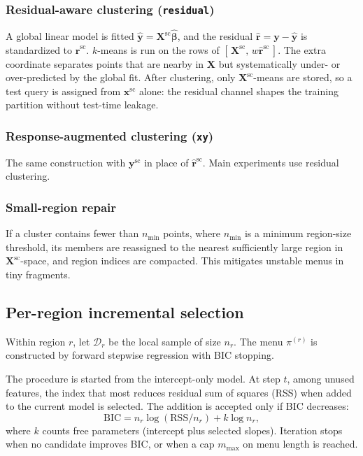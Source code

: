 \documentclass[pdflatex,sn-basic,Numbered]{sn-jnl}
\begin{document}
\subsubsection{Residual-aware clustering (\texttt{residual})}
A global linear model is fitted \(\hat{\mathbf{y}} = \mathbf{X}^{\mathrm{sc}}\hat{\boldsymbol{\beta}}\), and the residual \(\hat{\mathbf{r}} = \mathbf{y}-\hat{\mathbf{y}}\) is standardized to \(\hat{\mathbf{r}}^{\mathrm{sc}}\). \(k\)-means is run on the rows of \([\,\mathbf{X}^{\mathrm{sc}},\, w\hat{\mathbf{r}}^{\mathrm{sc}}\,]\). The extra coordinate separates points that are nearby in \(\mathbf{X}\) but systematically under- or over-predicted by the global fit. After clustering, only \(\mathbf{X}^{\mathrm{sc}}\)-means are stored, so a test query is assigned from \(\mathbf{x}^{\mathrm{sc}}\) alone: the residual channel shapes the training partition without test-time leakage.

\subsubsection{Response-augmented clustering (\texttt{xy})}
The same construction with \(\mathbf{y}^{\mathrm{sc}}\) in place of \(\hat{\mathbf{r}}^{\mathrm{sc}}\). Main experiments use residual clustering.

\subsubsection{Small-region repair}
If a cluster contains fewer than \(n_{\min}\) points, where \(n_{\min}\) is a minimum region-size threshold, its members are reassigned to the nearest sufficiently large region in \(\mathbf{X}^{\mathrm{sc}}\)-space, and region indices are compacted. This mitigates unstable menus in tiny fragments.

\subsection{Per-region incremental selection}

Within region \(r\), let \(\mathcal{D}_r\) be the local sample of size \(n_r\). The menu \(\pi^{(r)}\) is constructed by forward stepwise regression with BIC stopping.

The procedure is started from the intercept-only model. At step \(t\), among unused features, the index that most reduces residual sum of squares (RSS) when added to the current model is selected. The addition is accepted only if BIC decreases:
\[
\mathrm{BIC}= n_r\log(\mathrm{RSS}/n_r) + k\log n_r,
\]
where \(k\) counts free parameters (intercept plus selected slopes). Iteration stops when no candidate improves BIC, or when a cap \(m_{\max}\) on menu length is reached.
\end{document}
